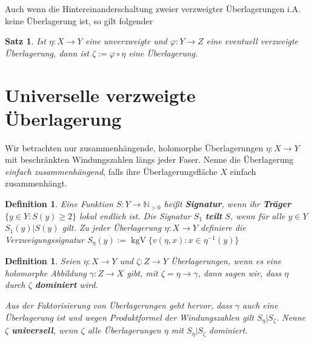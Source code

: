 \documentclass[12pt,a4paper]{article}
\theoremstyle{plain}
\newtheorem{Satz}[Theorem]{Satz}
\newtheorem{Definition}[Theorem]{Definition}
\newcommand{\herv}[1]{{\emph{\textbf{#1}}}}
\newcommand{\N}{\mathbb{N}}
\numberwithin{equation}{section}
\begin{document}
Auch wenn die Hintereinanderschaltung zweier verzweigter Überlagerungen i.A. keine Über\-la\-ge\-rung ist, so gilt folgender
\begin{Satz} Ist $\eta: X\rightarrow Y$ eine unverzweigte und $\varphi: Y\rightarrow Z$ eine eventuell verzweigte Überlagerung, dann ist $\zeta:=\varphi\circ \eta$ eine Überlagerung.
\end{Satz}
\section{Universelle verzweigte Überlagerung}
Wir betrachten nur zusammenhängende, holomorphe Überlagerungen $\eta:X\rightarrow Y$ mit beschränkten Windungszahlen längs jeder Faser. Nenne die Überlagerung \emph{einfach zusammenhängend}, falls ihre Überlagerungsfläche $X$ einfach zusammenhängt.
\begin{Definition} Eine Funktion $S:Y\rightarrow \N_{>0}$ heißt \herv{Signatur}, wenn ihr \herv{Träger} $\{y\in Y: S(y) \geq 2 \}$ lokal endlich ist. Die Signatur $S_1$ \herv{teilt} $S$, wenn  für alle $y\in Y$ $S_1(y)|S(y)$ gilt. Zu jeder Überlagerung $\eta:X\rightarrow Y$ definiere die Verzweigungssignatur $S_\eta(y):=\operatorname{kgV}\{v(\eta,x) : x \in \eta^{-1}(y)\}$
\end{Definition}
\begin{Definition} Seien $\eta:X\rightarrow Y$ und $\zeta: Z\rightarrow Y$ Überlagerungen, wenn es eine holomorphe Abbildung $\gamma: Z\rightarrow X$ gibt, mit $\zeta = \eta \rightarrow \gamma$, dann sagen wir, dass $\eta$ durch $\zeta$ \herv{dominiert} wird. 

Aus der Faktorisierung von Überlagerungen geht hervor, dass $\gamma$ auch eine Überlagerung ist und wegen Produktformel der Windungszahlen gilt $S_\eta | S_\zeta$. Nenne $\zeta$ \herv{universell}, wenn $\zeta$ alle Überlagerungen $\eta$ mit $S_\eta | S_\zeta$ dominiert.
\end{Definition}
\end{document}
